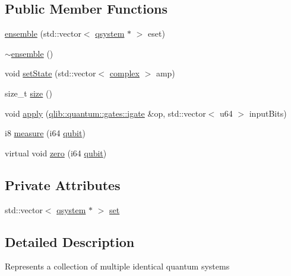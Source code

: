\subsection*{Public Member Functions}
\begin{DoxyCompactItemize}
\item 
\hyperlink{classqlib_1_1quantum_1_1ensemble_a5e088d9ac7394f150f5a2affe0790f2a}{ensemble} (std\+::vector$<$ \hyperlink{classqlib_1_1quantum_1_1qsystem}{qsystem} $\ast$ $>$ eset)
\item 
\hyperlink{classqlib_1_1quantum_1_1ensemble_aae0c56d2d64d4be27b5ab976d60c2747}{$\sim$ensemble} ()
\item 
void \hyperlink{classqlib_1_1quantum_1_1ensemble_a0eb45d5e78a713d118cef48152be57ae}{set\+State} (std\+::vector$<$ \hyperlink{classqlib_1_1math_1_1complex}{complex} $>$ amp)
\item 
size\+\_\+t \hyperlink{classqlib_1_1quantum_1_1ensemble_a4b811e4778f5c845504ed8eec058dfe4}{size} ()
\item 
void \hyperlink{classqlib_1_1quantum_1_1ensemble_a9226b1108f8d45d052316f7c366f1d5a}{apply} (\hyperlink{classqlib_1_1quantum_1_1gates_1_1igate}{qlib\+::quantum\+::gates\+::igate} \&op, std\+::vector$<$ u64 $>$ input\+Bits)
\item 
i8 \hyperlink{classqlib_1_1quantum_1_1ensemble_ae5e3ebd119e1df6dbb966b7bb6222e5a}{measure} (i64 \hyperlink{classqlib_1_1quantum_1_1qubit}{qubit})
\item 
virtual void \hyperlink{classqlib_1_1quantum_1_1ensemble_ac170f82a86704e08e8f2bebc721cf03b}{zero} (i64 \hyperlink{classqlib_1_1quantum_1_1qubit}{qubit})
\end{DoxyCompactItemize}
\subsection*{Private Attributes}
\begin{DoxyCompactItemize}
\item 
std\+::vector$<$ \hyperlink{classqlib_1_1quantum_1_1qsystem}{qsystem} $\ast$ $>$ \hyperlink{classqlib_1_1quantum_1_1ensemble_ab77e11f30898f29060ff97236ec26319}{set}
\end{DoxyCompactItemize}


\subsection{Detailed Description}
Represents a collection of multiple identical quantum systems 

